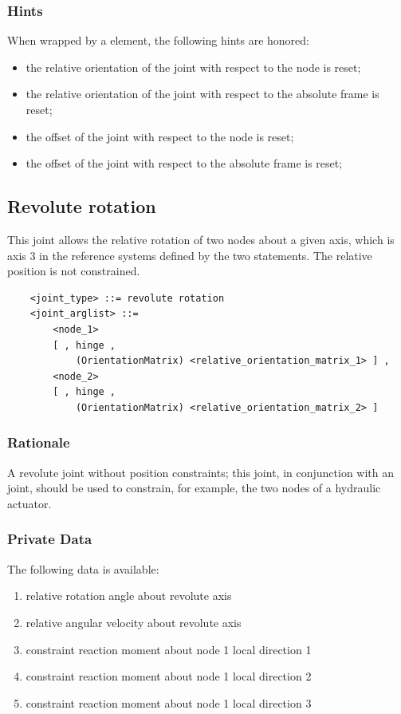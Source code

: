 \subsubsection{Hints}
When wrapped by a  element, the following hints are honored:
\begin{itemize}
\item {} the relative orientation of the joint
with respect to the node is reset;
\item {} the relative orientation of the joint
with respect to the absolute frame is reset;
\item {} the offset of the joint
with respect to the node is reset;
\item {} the offset of the joint
with respect to the absolute frame is reset;
\end{itemize}






\subsection{Revolute rotation}
\label{sec:EL:STRUCT:JOINT:REVOLUTE_ROTATION}
This joint allows the relative rotation of two nodes about
a given axis, which is axis 3 in the reference systems defined 
by the two  statements.
The relative position is not constrained.
\begin{verbatim}
    <joint_type> ::= revolute rotation
    <joint_arglist> ::= 
        <node_1>
        [ , hinge , 
            (OrientationMatrix) <relative_orientation_matrix_1> ] ,
        <node_2>
        [ , hinge , 
            (OrientationMatrix) <relative_orientation_matrix_2> ]
\end{verbatim}

\subsubsection{Rationale}
A revolute joint without position constraints; this joint, in conjunction
with an  joint, should be used to constrain, for example,
the two nodes of a hydraulic actuator.

\subsubsection{Private Data}
The following data is available:
\begin{enumerate}
\item {} relative rotation angle about revolute axis
\item {} relative angular velocity about revolute axis
\item {} constraint reaction moment about node 1 local direction 1
\item {} constraint reaction moment about node 1 local direction 2
\item {} constraint reaction moment about node 1 local direction 3
\end{enumerate}

